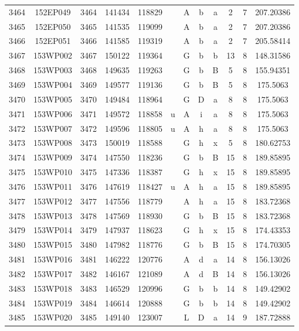 \begin{tabular}{|*{12}{c|}}
3464 & 152EP049 & 3464 & 141434 & 118829 &  & A & b & a & 2 & 7 & 207.20386 \\ 
3465 & 152EP050 & 3465 & 141535 & 119099 &  & A & b & a & 2 & 7 & 207.20386 \\ 
3466 & 152EP051 & 3466 & 141585 & 119319 &  & A & b & a & 2 & 7 & 205.58414 \\ 
3467 & 153WP002 & 3467 & 150122 & 119364 &  & G & b & b & 13 & 8 & 148.31586 \\ 
3468 & 153WP003 & 3468 & 149635 & 119263 &  & G & b & B & 5 & 8 & 155.94351 \\ 
3469 & 153WP004 & 3469 & 149577 & 119136 &  & G & b & B & 5 & 8 & 175.5063 \\ 
3470 & 153WP005 & 3470 & 149484 & 118964 &  & G & D & a & 8 & 8 & 175.5063 \\ 
3471 & 153WP006 & 3471 & 149572 & 118858 & u & A & i & a & 8 & 8 & 175.5063 \\ 
3472 & 153WP007 & 3472 & 149596 & 118805 & u & A & h & a & 8 & 8 & 175.5063 \\ 
3473 & 153WP008 & 3473 & 150019 & 118588 &  & G & h & x & 5 & 8 & 180.62753 \\ 
3474 & 153WP009 & 3474 & 147550 & 118236 &  & G & b & B & 15 & 8 & 189.85895 \\ 
3475 & 153WP010 & 3475 & 147336 & 118387 &  & G & h & x & 15 & 8 & 189.85895 \\ 
3476 & 153WP011 & 3476 & 147619 & 118427 & u & A & h & a & 15 & 8 & 189.85895 \\ 
3477 & 153WP012 & 3477 & 147556 & 118779 &  & A & h & a & 15 & 8 & 183.72368 \\ 
3478 & 153WP013 & 3478 & 147569 & 118930 &  & G & b & B & 15 & 8 & 183.72368 \\ 
3479 & 153WP014 & 3479 & 147937 & 118623 &  & G & h & x & 15 & 8 & 174.43353 \\ 
3480 & 153WP015 & 3480 & 147982 & 118776 &  & G & b & B & 15 & 8 & 174.70305 \\ 
3481 & 153WP016 & 3481 & 146222 & 120776 &  & A & d & a & 14 & 8 & 156.13026 \\ 
3482 & 153WP017 & 3482 & 146167 & 121089 &  & A & d & B & 14 & 8 & 156.13026 \\ 
3483 & 153WP018 & 3483 & 146529 & 120996 &  & G & b & b & 14 & 8 & 149.42902 \\ 
3484 & 153WP019 & 3484 & 146614 & 120888 &  & G & b & b & 14 & 8 & 149.42902 \\ 
3485 & 153WP020 & 3485 & 149140 & 123007 &  & L & D & a & 14 & 9 & 187.72888 \\ 

\end{tabular}
